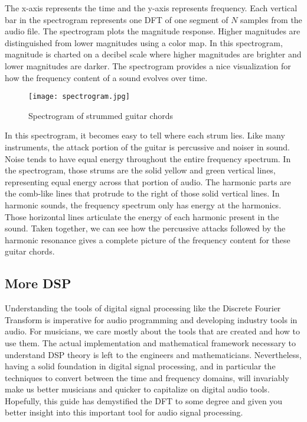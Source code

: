 The x-axis represents the time and the y-axis represents frequency.  Each vertical bar in the spectrogram 
represents one DFT of one segment of $N$ samples from the audio file.  The spectrogram plots the magnitude
response.  Higher magnitudes are distinguished from lower magnitudes using a color map.  In this 
spectrogram, magnitude is charted on a decibel scale where higher magnitudes are brighter and lower magnitudes
are darker.  The spectrogram provides a nice visualization for how the frequency content of a sound evolves over
time.  

\begin{figure}[h]
	\caption{Spectrogram of strummed guitar chords}
	\label{fig:spectrogram}
	\begin{center}
		\texttt{[image: spectrogram.jpg]}
	\end{center}
\end{figure}

In this spectrogram, it becomes easy to tell where each strum lies.  Like many instruments, the attack portion of
the guitar is percussive and noiser in sound.  Noise tends to have equal energy throughout the entire frequency 
spectrum.  In the spectrogram, those strums are the solid yellow and green vertical lines, representing equal
energy across that portion of audio.  The harmonic parts are the comb-like lines that protrude to the right
of those solid vertical lines.  In harmonic sounds, the frequency spectrum only has energy at the harmonics.
Those horizontal lines articulate the energy of each harmonic present in the sound.  Taken together, we can see
how the percussive attacks followed by the harmonic resonance gives a complete picture of the frequency
content for these guitar chords.

\subsection*{More DSP}

Understanding the tools of digital signal processing like the Discrete Fourier Transform is imperative for
audio programming and developing industry tools in audio.  For musicians, we care mostly about the
tools that are created and how to use them.  The actual implementation and mathematical framework 
necessary to understand DSP theory is left to the engineers and mathematicians.  Nevertheless, having a 
solid foundation in digital signal processing, and in particular the techniques to convert between
the time and frequency domains, will invariably make us better musicians and quicker to capitalize
on digital audio tools.  Hopefully, this guide has demystified the DFT to some degree and given you
better insight into this important tool for audio signal processing.